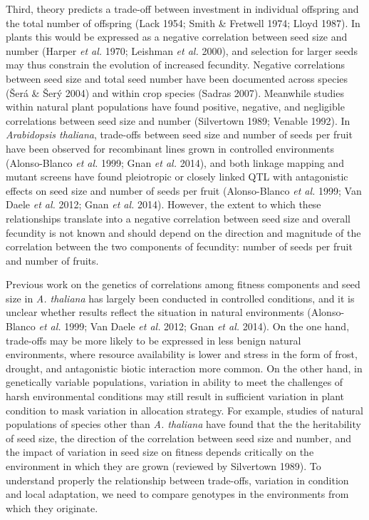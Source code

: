\documentclass[]{article}
\begin{document}
Third, theory predicts a trade-off between investment in individual offspring and the total number of offspring (Lack 1954; Smith \& Fretwell 1974; Lloyd 1987). In plants this would be expressed as a negative correlation between seed size and number (Harper \emph{et al.} 1970; Leishman \emph{et al.} 2000), and selection for larger seeds may thus constrain the evolution of increased fecundity. Negative correlations between seed size and total seed number have been documented across species (Šerá \& Šerý 2004) and within crop species (Sadras 2007). Meanwhile studies within natural plant populations have found positive, negative, and negligible correlations between seed size and number (Silvertown 1989; Venable 1992). In \emph{Arabidopsis thaliana}, trade-offs between seed size and number of seeds per fruit have been observed for recombinant lines grown in controlled environments (Alonso-Blanco \emph{et al.} 1999; Gnan \emph{et al.} 2014), and both linkage mapping and mutant screens have found pleiotropic or closely linked QTL with antagonistic effects on seed size and number of seeds per fruit (Alonso-Blanco \emph{et al.} 1999; Van Daele \emph{et al.} 2012; Gnan \emph{et al.} 2014). However, the extent to which these relationships translate into a negative correlation between seed size and overall fecundity is not known and should depend on the direction and magnitude of the correlation between the two components of fecundity: number of seeds per fruit and number of fruits.

Previous work on the genetics of correlations among fitness components and seed size in \emph{A. thaliana} has largely been conducted in controlled conditions, and it is unclear whether results reflect the situation in natural environments (Alonso-Blanco \emph{et al.} 1999; Van Daele \emph{et al.} 2012; Gnan \emph{et al.} 2014). On the one hand, trade-offs may be more likely to be expressed in less benign natural environments, where resource availability is lower and stress in the form of frost, drought, and antagonistic biotic interaction more common. On the other hand, in genetically variable populations, variation in ability to meet the challenges of harsh environmental conditions may still result in sufficient variation in plant condition to mask variation in allocation strategy. For example, studies of natural populations of species other than \emph{A. thaliana} have found that the the heritability of seed size, the direction of the correlation between seed size and number, and the impact of variation in seed size on fitness depends critically on the environment in which they are grown (reviewed by Silvertown 1989). To understand properly the relationship between trade-offs, variation in condition and local adaptation, we need to compare genotypes in the environments from which they originate.
\end{document}
